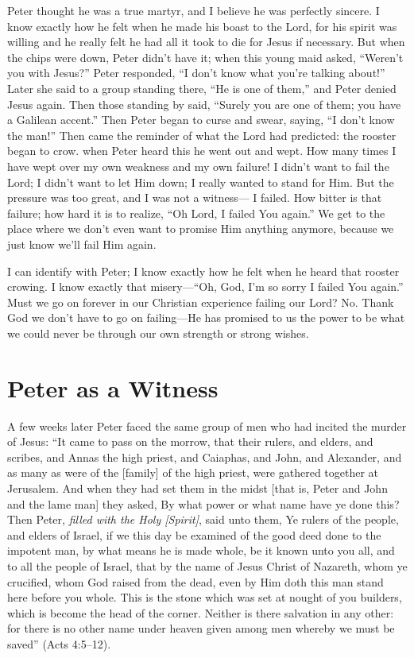 Peter thought he was a true martyr, and I believe he was
perfectly sincere. I know exactly how he felt when he made
his boast to the Lord, for his spirit was willing and he really
felt he had all it took to die for Jesus if necessary. But when
the chips were down, Peter didn’t have it; when this young
maid asked, “Weren’t you with Jesus?” Peter responded, “I
don’t know what you’re talking about!” Later she said to a
group standing there, “He is one of them,” and Peter denied
Jesus again. Then those standing by said, “Surely you are
one of them; you have a Galilean accent.” Then Peter began
to curse and swear, saying, “I don’t know the man!” Then
came the reminder of what the Lord had predicted: the
rooster began to crow. when Peter heard this he went out
and wept. How many times I have wept over my own
weakness and my own failure! I didn’t want to fail the Lord;
I didn’t want to let Him down; I really wanted to stand for
Him. But the pressure was too great, and I was not a witness—
I failed. How bitter is that failure; how hard it is to
realize, “Oh Lord, I failed You again.” We get to the place
where we don’t even want to promise Him anything anymore,
because we just know we’ll fail Him again.

I can identify with Peter; I know exactly how he felt
when he heard that rooster crowing. I know exactly that
misery—“Oh, God, I’m so sorry I failed You again.” Must
we go on forever in our Christian experience failing our
Lord? No. Thank God we don’t have to go on failing—He
has promised to us the power to be what we could never be
through our own strength or strong wishes.


\section*{Peter as a Witness}

A few weeks later Peter faced the same group of men
who had incited the murder of Jesus: “It came to pass on
the morrow, that their rulers, and elders, and scribes, and
Annas the high priest, and Caiaphas, and John, and Alexander,
and as many as were of the [family] of the high priest,
were gathered together at Jerusalem. And when they had
set them in the midst [that is, Peter and John and the lame
man] they asked, By what power or what name have ye
done this? Then Peter, \emph{filled with the Holy [Spirit]}, said unto
them, Ye rulers of the people, and elders of Israel, if we this
day be examined of the good deed done to the impotent
man, by what means he is made whole, be it known unto
you all, and to all the people of Israel, that by the name of
Jesus Christ of Nazareth, whom ye crucified, whom God
raised from the dead, even by Him doth this man stand here
before you whole. This is the stone which was set at nought
of you builders, which is become the head of the corner.
Neither is there salvation in any other: for there is no other
name under heaven given among men whereby we must be
saved” (Acts 4:5–12).

